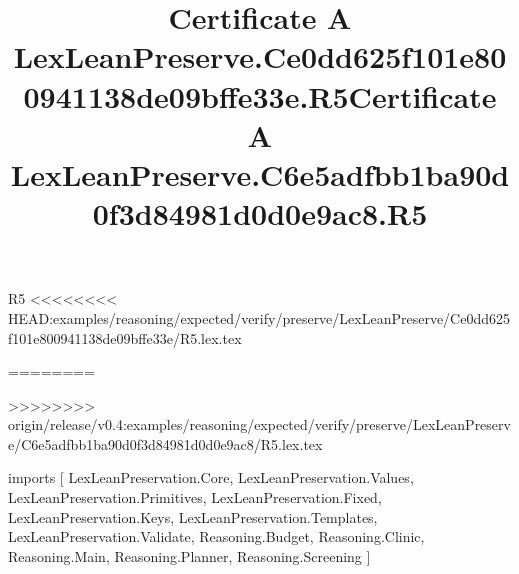 \begin{lexlean}{R5}
<<<<<<<< HEAD:examples/reasoning/expected/verify/preserve/LexLeanPreserve/Ce0dd625f101e800941138de09bffe33e/R5.lex.tex
\title{Certificate A LexLeanPreserve.Ce0dd625f101e800941138de09bffe33e.R5}
========
\title{Certificate A LexLeanPreserve.C6e5adfbb1ba90d0f3d84981d0d0e9ac8.R5}
>>>>>>>> origin/release/v0.4:examples/reasoning/expected/verify/preserve/LexLeanPreserve/C6e5adfbb1ba90d0f3d84981d0d0e9ac8/R5.lex.tex
\begin{coremodule}
imports [
  LexLeanPreservation.Core,
  LexLeanPreservation.Values,
  LexLeanPreservation.Primitives,
  LexLeanPreservation.Fixed,
  LexLeanPreservation.Keys,
  LexLeanPreservation.Templates,
  LexLeanPreservation.Validate,
  Reasoning.Budget,
  Reasoning.Clinic,
  Reasoning.Main,
  Reasoning.Planner,
  Reasoning.Screening
]


\end{coremodule}
\end{lexlean}
